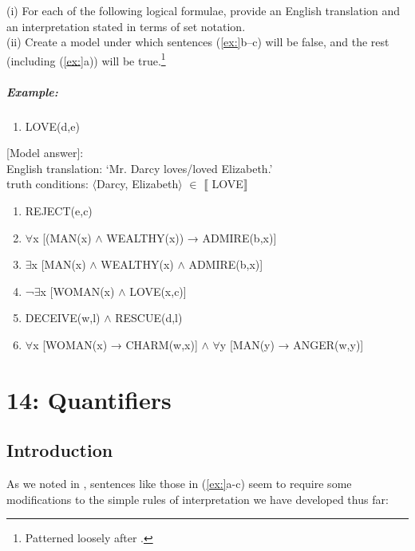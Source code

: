 \begin{stylepoints}
(i) For each of the following logical formulae, provide an English translation and an interpretation stated in terms of set notation.\\
(ii) Create a model under which sentences (\ref{ex:}b--c) will be false, and the rest (including (\ref{ex:}a)) will be true.\footnote{Patterned loosely after \citet[350]{Saeed2009}.}
\end{stylepoints}

\paragraph{Example:}

\begin{enumerate}
\item LOVE(d,e)
\end{enumerate}

\textsf{[Model answer]:\\
English translation: ‘Mr. Darcy loves/loved Elizabeth.’\\
truth conditions:} $\langle$\textsf{Darcy, Elizabeth}$\rangle$\textsf{} ${\in}$\textsf{} $\llbracket$ \textsf{LOVE}$\rrbracket$ 

\begin{enumerate}
\item REJECT(e,c)
\item ${\forall}$x [(MAN(x) $\wedge$ WEALTHY(x)) → ADMIRE(b,x)]
\item ${\exists}$x [MAN(x) $\wedge$ WEALTHY(x) $\wedge$ ADMIRE(b,x)]
\item ¬${\exists}$x [WOMAN(x) $\wedge$ LOVE(x,c)]
\item DECEIVE(w,l) $\wedge$ RESCUE(d,l)
\item ${\forall}$x [WOMAN(x) → CHARM(w,x)] $\wedge$ ${\forall}$y [MAN(y) → ANGER(w,y)]
\end{enumerate}

\chapter{{14}: Quantifiers}

\section{Introduction}\label{sec:} %

As we noted in , sentences like those in (\ref{ex:}a-c) seem to require some modifications to the simple rules of interpretation we have developed thus far:



